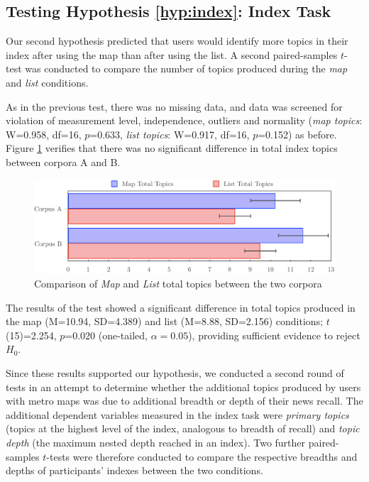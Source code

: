 \subsection{Testing Hypothesis \ref{hyp:index}: Index Task}

Our second hypothesis predicted that users would identify more topics in their index after using the map than after using the list. A second paired-samples $t$-test was conducted to compare the number of topics produced during the \textit{map} and \textit{list} conditions.

As in the previous test, there was no missing data, and data was screened for violation of measurement level, independence, outliers and normality (\textit{map topics}: W=0.958, df=16, $p$=0.633,  \textit{list topics}: W=0.917, df=16, $p$=0.152) as before. Figure \ref{fig:index} verifies that there was no significant difference in total index topics between corpora A and B.

\begin{figure}[htbp!]
	\centering
	\includegraphics[width=\textwidth]{img/evaluation/index.pdf}
	\caption{Comparison of \textit{Map} and \textit{List} total topics between the two corpora}
	\label{fig:index}
\end{figure}

The results of the test showed a significant difference in total topics produced in the map (M=10.94, SD=4.389) and list (M=8.88, SD=2.156) conditions; $t$(15)=2.254, $p$=0.020 (one-tailed, $\alpha=0.05$), providing sufficient evidence to reject $H_0$.

Since these results supported our hypothesis, we conducted a second round of tests in an attempt to determine whether the additional topics produced by users with metro maps was due to additional breadth or depth of their news recall. The additional dependent variables measured in the index task were \textit{primary topics} (topics at the highest level of the index, analogous to breadth of recall) and \textit{topic depth} (the maximum nested depth reached in an index). Two further paired-samples $t$-tests were therefore conducted to compare the respective breadths and depths of participants' indexes between the two conditions.

